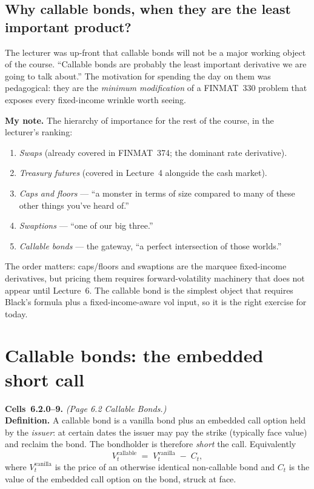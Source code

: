 \subsection{Why callable bonds, when they are the least important
product?}\label{L5-sec:why-callable}

The lecturer was up-front that callable bonds will not be a major
working object of the course. ``Callable bonds are probably the least
important derivative we are going to talk about.'' The motivation for
spending the day on them was pedagogical: they are the \emph{minimum
modification} of a FINMAT~330 problem that exposes every fixed-income
wrinkle worth seeing.

\begin{checkpoint}
\textbf{My note.} The hierarchy of importance for the rest of the
course, in the lecturer's ranking:
\begin{enumerate}[label=(\arabic*)]
  \item \emph{Swaps} (already covered in FINMAT~374; the dominant rate
        derivative).
  \item \emph{Treasury futures} (covered in Lecture~4 alongside the
        cash market).
  \item \emph{Caps and floors} --- ``a monster in terms of size
        compared to many of these other things you've heard of.''
  \item \emph{Swaptions} --- ``one of our big three.''
  \item \emph{Callable bonds} --- the gateway, ``a perfect
        intersection of those worlds.''
\end{enumerate}
The order matters: caps/floors and swaptions are the marquee
fixed-income derivatives, but pricing them requires forward-volatility
machinery that does not appear until Lecture~6. The callable bond is
the simplest object that requires Black's formula plus a
fixed-income-aware vol input, so it is the right exercise for today.
\end{checkpoint}

\section{Callable bonds: the embedded short call}\label{L5-sec:callable-setup}

\begin{keyblock}
\textbf{Cells~6.2.0--9.} \emph{(Page 6.2 \textperiodcentered{} Callable
Bonds.)}\\
\textbf{Definition.} A callable bond is a vanilla bond plus an
embedded call option held by the \emph{issuer}: at certain dates the
issuer may pay the strike (typically face value) and reclaim the bond.
The bondholder is therefore \emph{short} the call. Equivalently
\[
  V^{\text{callable}}_t \;=\; V^{\text{vanilla}}_t \;-\; C_t,
\]
where $V^{\text{vanilla}}_t$ is the price of an otherwise identical
non-callable bond and $C_t$ is the value of the embedded call option
on the bond, struck at face.
\end{keyblock}

